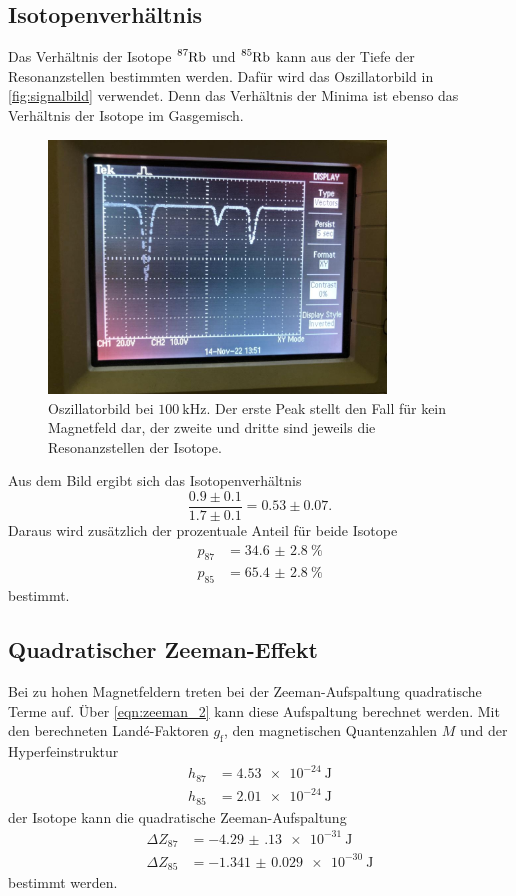 \subsection{Isotopenverhältnis}
\label{ssec:verhältnis}

Das Verhältnis der Isotope $\ce{^{87}Rb}$ und $\ce{^{85}Rb}$ kann aus der Tiefe der Resonanzstellen bestimmten werden.
Dafür wird das Oszillatorbild in \autoref{fig:signalbild} verwendet.
Denn das Verhältnis der Minima ist ebenso das Verhältnis der Isotope im Gasgemisch.
\begin{figure}
    \centering
    \includegraphics[width=0.8\textwidth]{plots/signalbild.jpeg}
    \caption{Oszillatorbild bei $\qty{100}{\kilo\hertz}$. Der erste Peak stellt den Fall für kein Magnetfeld dar, der zweite und dritte sind jeweils die Resonanzstellen der Isotope.}
    \label{fig:signalbild}
\end{figure}
Aus dem Bild ergibt sich das Isotopenverhältnis
\begin{equation}
    \frac{0.9 \pm 0.1}{1.7 \pm 0.1} = 0.53 \pm 0.07.
\end{equation}
Daraus wird zusätzlich der prozentuale Anteil für beide Isotope
\begin{align*}
    p_\text{87} &= \qty{34.6(28)}{\percent} \\
    p_\text{85} &= \qty{65.4(28)}{\percent}
\end{align*}
bestimmt.

\subsection{Quadratischer Zeeman-Effekt}
\label{ssec:zeeman}

Bei zu hohen Magnetfeldern treten bei der Zeeman-Aufspaltung quadratische Terme auf.
Über \autoref{eqn:zeeman_2} kann diese Aufspaltung berechnet werden.
Mit den berechneten Landé-Faktoren $g_\text{f}$, den magnetischen Quantenzahlen $M$ und der Hyperfeinstruktur 
\begin{align*}
    h_{87} &= \qty{4.53e-24}{\joule} \\
    h_{85} &= \qty{2.01e-24}{\joule}
\end{align*}
der Isotope kann die quadratische Zeeman-Aufspaltung 
\begin{align*}
    \Delta Z_{87} &= \qty{-4.29(13)e-31}{\joule} \\
    \Delta Z_{85} &= \qty{-1.341(29)e-30}{\joule}
\end{align*}
bestimmt werden.

